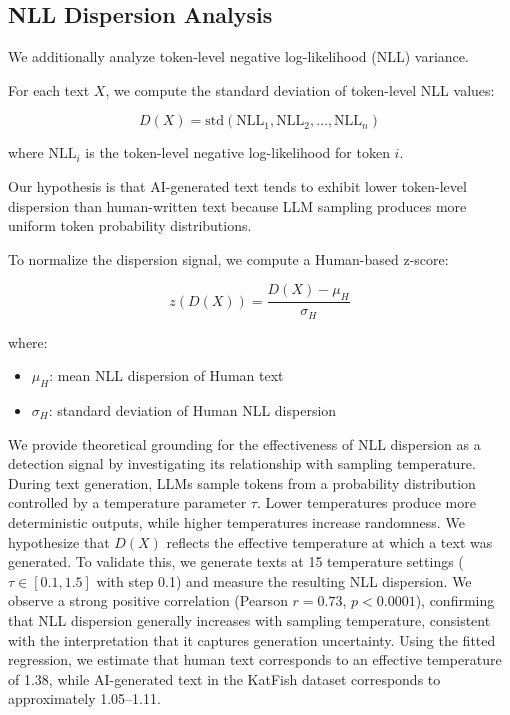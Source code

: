 \documentclass{article}
\begin{document}
\subsection{NLL Dispersion Analysis}

We additionally analyze token-level negative log-likelihood (NLL) variance.

For each text \(X\), we compute the standard deviation of token-level NLL values:

\[
D(X)=\mathrm{std}(\mathrm{NLL}_1,\mathrm{NLL}_2,\dots,\mathrm{NLL}_n)
\]

where \(\mathrm{NLL}_i\) is the token-level negative log-likelihood for token \(i\).

Our hypothesis is that AI-generated text tends to exhibit lower token-level dispersion than human-written text because LLM sampling produces more uniform token probability distributions.

To normalize the dispersion signal, we compute a Human-based z-score:

\[
z(D(X))=\frac{D(X)-\mu_H}{\sigma_H}
\]

where:

\begin{itemize}
    \item \(\mu_H\): mean NLL dispersion of Human text
    \item \(\sigma_H\): standard deviation of Human NLL dispersion
\end{itemize}

We provide theoretical grounding for the effectiveness of NLL dispersion as a detection signal by investigating its relationship with sampling temperature. During text generation, LLMs sample tokens from a probability distribution controlled by a temperature parameter $\tau$. Lower temperatures produce more deterministic outputs, while higher temperatures increase randomness. We hypothesize that $D(X)$ reflects the effective temperature at which a text was generated. To validate this, we generate texts at 15 temperature settings ($\tau \in [0.1, 1.5]$ with step 0.1) and measure the resulting NLL dispersion. We observe a strong positive correlation (Pearson $r = 0.73$, $p < 0.0001$), confirming that NLL dispersion generally increases with sampling temperature, consistent with the interpretation that it captures generation uncertainty. Using the fitted regression, we estimate that human text corresponds to an effective temperature of 1.38, while AI-generated text in the KatFish dataset corresponds to approximately 1.05--1.11.
\end{document}
